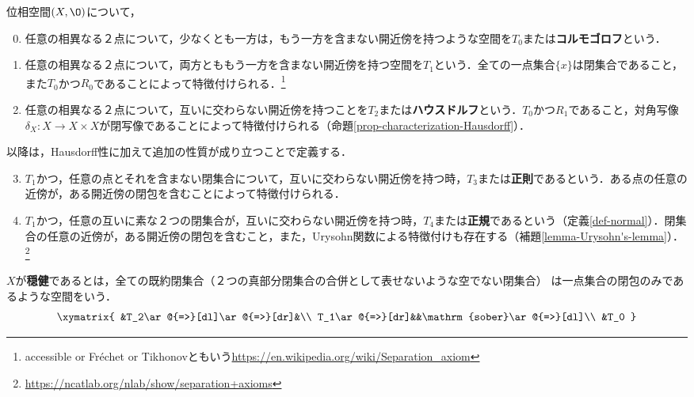 \documentclass[uplatex,dvipdfmx]{jsreport}
\begin{document}
\begin{definition}
    位相空間$(X,\O)$について，
    \begin{enumerate}\setcounter{enumi}{-1}
        \item 任意の相異なる２点について，少なくとも一方は，もう一方を含まない開近傍を持つような空間を$T_0$または\textbf{コルモゴロフ}という．
        \item 任意の相異なる２点について，両方とももう一方を含まない開近傍を持つ空間を$T_1$という．全ての一点集合$\{x\}$は閉集合であること，また$T_0$かつ$R_0$であることによって特徴付けられる．\footnote{accessible or Fréchet or Tikhonovともいう\url{https://en.wikipedia.org/wiki/Separation_axiom}}
        \item 任意の相異なる２点について，互いに交わらない開近傍を持つことを$T_2$または\textbf{ハウスドルフ}という．$T_0$かつ$R_1$であること，対角写像$\delta_X:X\to X\times X$が閉写像であることによって特徴付けられる（命題\ref{prop-characterization-Hausdorff}）．
    \end{enumerate}
    以降は，Hausdorff性に加えて追加の性質が成り立つことで定義する．
    \begin{enumerate}\setcounter{enumi}{2}
        \item $T_1$かつ，任意の点とそれを含まない閉集合について，互いに交わらない開近傍を持つ時，$T_3$または\textbf{正則}であるという．ある点の任意の近傍が，ある開近傍の閉包を含むことによって特徴付けられる．
        \item $T_1$かつ，任意の互いに素な２つの閉集合が，互いに交わらない開近傍を持つ時，$T_4$または\textbf{正規}であるという（定義\ref{def-normal}）．閉集合の任意の近傍が，ある開近傍の閉包を含むこと，また，Urysohn関数による特徴付けも存在する（補題\ref{lemma-Urysohn's-lemma}）．\footnote{\url{https://ncatlab.org/nlab/show/separation+axioms}}
    \end{enumerate}
    $X$が\textbf{穏健}であるとは，全ての既約閉集合（２つの真部分閉集合の合併として表せないような空でない閉集合）
    は一点集合の閉包のみであるような空間をいう．
    \[\xymatrix{
        &T_2\ar@{=>}[dl]\ar@{=>}[dr]&\\
        T_1\ar@{=>}[dr]&&\mathrm{sober}\ar@{=>}[dl]\\
        &T_0
    }\]
\end{definition}
\end{document}
